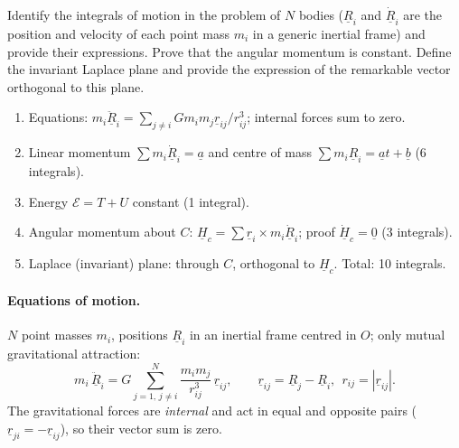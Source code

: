 \begin{qbox}
Identify the integrals of motion in the problem of $N$ bodies ($\underline R_i$ and $\dot{\underline R}_i$ are the position and velocity of
each point mass $m_i$ in a generic inertial frame) and provide their expressions. Prove that the angular momentum is constant.
Define the invariant Laplace plane and provide the expression of the remarkable vector orthogonal to this plane.
\end{qbox}

\begin{outline}
\begin{enumerate}
\item Equations: $m_i\ddot{\underline R}_i=\sum_{j\neq i}Gm_im_j\underline r_{ij}/r_{ij}^3$; internal forces sum to zero.
\item Linear momentum $\sum m_i\dot{\underline R}_i=\underline a$ and centre of mass $\sum m_i\underline R_i=\underline at+\underline b$ (6 integrals).
\item Energy $\mathcal E=T+U$ constant (1 integral).
\item Angular momentum about $C$: $\underline H_c=\sum\underline r_i\times m_i\dot{\underline R}_i$; proof $\dot{\underline H}_c=\underline 0$ (3 integrals).
\item Laplace (invariant) plane: through $C$, orthogonal to $\underline H_c$. Total: 10 integrals.
\end{enumerate}
\end{outline}

\answer
\paragraph{Equations of motion.} $N$ point masses $m_i$, positions $\underline R_i$ in an inertial frame centred in $O$; only mutual
gravitational attraction:
\begin{equation}
m_{i}\,\ddot{\underline R}_{i}=G\sum_{j=1,\,j\neq i}^{N}\frac{m_{i}m_{j}}{r_{ij}^{3}}\,\underline{r}_{ij},\qquad
\underline r_{ij}=\underline R_j-\underline R_i,\ \ r_{ij}=|\underline r_{ij}|.
\end{equation}
The gravitational forces are \emph{internal} and act in equal and opposite pairs ($\underline r_{ji}=-\underline r_{ij}$), so their vector
sum is zero.

